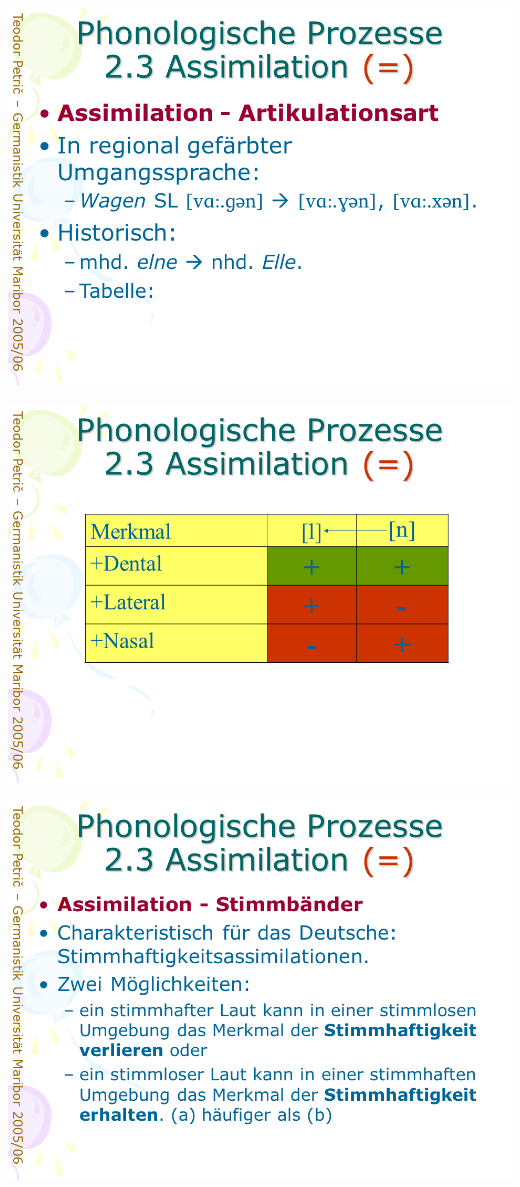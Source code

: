 \documentclass[
  letterpaper,
]{scrbook}
\begin{document}
\includegraphics[width=1\textwidth,height=\textheight]{./pictures/prozesse/prozesse_30.PNG}

\includegraphics[width=1\textwidth,height=\textheight]{./pictures/prozesse/prozesse_31.PNG}

\includegraphics[width=1\textwidth,height=\textheight]{./pictures/prozesse/prozesse_32.PNG}
\end{document}
